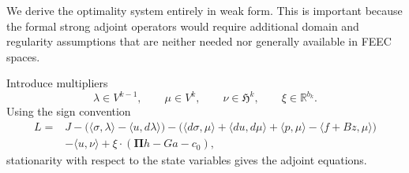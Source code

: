 \documentclass{article}
\DeclareMathOperator{\grad}{grad}
\DeclareMathOperator{\curl}{curl}
\newcommand{\R} {\mathbb R}
\newcommand{\HH}{\mathfrak H}
\newcommand{\Piop}{\boldsymbol\Pi}
\newcommand{\ip}[2]{\langle #1,#2\rangle}
\begin{document}


We derive the optimality system entirely in weak form. This is important because the formal strong adjoint operators would require additional domain and regularity assumptions that are neither needed nor generally available in FEEC spaces.

Introduce multipliers
\[
 \lambda\in V^{k-1},\qquad \mu\in V^k,\qquad \nu\in\HH^k,
 \qquad \xi\in\R^{b_k}.
\]
Using the sign convention
\begin{equation*}
\begin{array}{rl}
 L={}&J
-\big(\ip{\sigma}{\lambda}-\ip{u}{d\lambda}\big)
-\big(\ip{d\sigma}{\mu}+\ip{du}{d\mu}+\ip{p}{\mu}-\ip{f+Bz}{\mu}\big)\\
&-\ip{u}{\nu}+\xi\cdot(\Piop h-Ga-c_0),
\end{array}
\end{equation*}
stationarity with respect to the state variables gives the adjoint equations.
\end{document}

